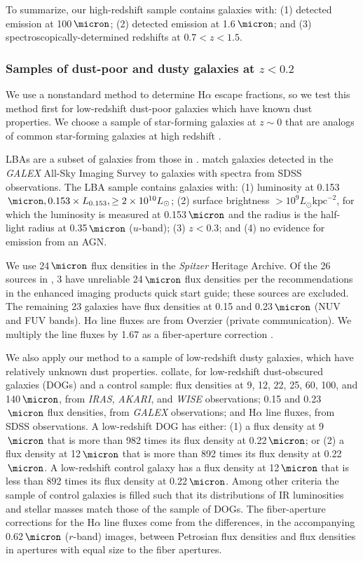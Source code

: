 \documentclass[preprint]{aastex}
\begin{document}
To summarize, our high-redshift sample contains galaxies with: (1) detected
emission at 100$\,\micron$; (2) detected emission at 1.6$\,\micron$; and (3)
spectroscopically-determined redshifts at $0.7 < z < 1.5$.

\subsubsection{Samples of dust-poor and dusty galaxies at $z < 0.2$}

We use a nonstandard method to determine H$\alpha$ escape fractions, so we test this
method first for low-redshift dust-poor galaxies which have known dust
properties.  We choose a sample of star-forming galaxies at $z \sim 0$ that are
analogs of common star-forming galaxies at high redshift
\citep[LBAs;][]{overzier09,overzier11}.

LBAs are a subset of galaxies from those in \citet{heckman05}.
\citet{heckman05} match galaxies detected in the \emph{GALEX} All-Sky Imaging
Survey to galaxies with spectra from SDSS observations.  The LBA sample contains
galaxies with: (1) luminosity at 0.153$\,\micron, 0.153 \times L_{0.153},
\ge 2 \times 10^{10} L_{\odot}$; (2) surface brightness $> 10^{9} L_{\odot}
\mathrm{kpc}^{-2}$, for which the luminosity is measured at 0.153$\,\micron$
and the radius is the half-light radius at 0.35$\,\micron$ ($u$-band);
(3) $z < 0.3$; and (4) no evidence for emission from an AGN.

We use 24$\,\micron$ flux densities in the \emph{Spitzer} Heritage Archive.  Of
the 26 sources in \citet{overzier11}, 3 have unreliable 24$\,\micron$ flux
densities per the recommendations in the enhanced imaging products quick start
guide; these sources are excluded.  The remaining 23 galaxies have flux
densities at
0.15 and 0.23$\,\micron$ (NUV and FUV bands).
H$\alpha$ line
fluxes are from Overzier (private communication).  We
multiply the line fluxes by 1.67 as a fiber-aperture correction
\citep{overzier09}.

We also apply our method to a sample of low-redshift dusty galaxies, which have
relatively unknown dust properties.  \citet{hwang13} collate, for low-redshift
dust-obscured galaxies (DOGs) and a control sample: flux densities at
9, 12, 22, 25, 60, 100, and 140$\,\micron$, from \emph{IRAS}, \emph{AKARI}, and
\emph{WISE} observations; 0.15 and 0.23$\,\micron$ flux densities, from
\emph{GALEX} observations; and H$\alpha$ line fluxes, from SDSS observations.
A low-redshift DOG has either: (1) a flux density at 9$\,\micron$ that is more
than 982 times its flux density at 0.22$\,\micron$; or (2) a flux density at
12$\,\micron$ that is more than 892 times its flux density at 0.22$\,\micron$.
A low-redshift control galaxy has a flux density at
12$\,\micron$ that is less than 892 times its flux density at 0.22$\,\micron$.
Among other criteria the sample of control galaxies is filled such that its
distributions of IR luminosities and stellar masses match those of the sample
of DOGs.
The fiber-aperture corrections for the H$\alpha$ line fluxes come from the
differences, in the accompanying 0.62$\,\micron$ ($r$-band) images, between
Petrosian flux
densities and flux densities in apertures with equal size to the fiber
apertures.
\end{document}
